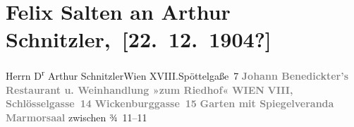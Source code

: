 

         
         \renewcommand{\erwaehntePersonen}{Personen: Johann Benedickter, Anna Katharina Rehmann, Felix Salten, Ottilie Salten}
         \renewcommand{\erwaehnteOrte}{Orte: Edmund-Weiß-Gasse 7, Riedhof, Schlösselgasse, Wickenburggasse, Wien, XVIII., Währing}
         \renewcommand{\erwaehnteWerke}{Werke: Symphonie Nr. 3 D-Moll}
               \section[ Felix Salten an Arthur Schnitzler, {[}22. 12. 1904?{]}]{ Felix Salten an Arthur Schnitzler, {[}22. 12. 1904?{]}}\nopagebreak{}\rehead{ }\begin{ledgroupsized}[t]{13cm}\normalsize\beginnumbering \toendnotes[C]{\smallbreak\pagebreak[2]} 
\toendnotes[C]{\smallbreak}\pstart{}{\pb}Herrn D\textsuperscript{r} Arthur Schnitzler\pend{}\pstart{}Wien XVIII.\pend{}\pstart{}Spöttelgaße 7\pend{}{\bigskip}\pstart
           \noindent{}\centering{}{\pb}\textcolor{gray}{\textbf{Johann Benedickter’s}}\pend
           \pstart
           \noindent{}\centering{}\textcolor{gray}{\textbf{Restaurant u. Weinhandlung »zum Riedhof«}}\pend
           \pstart
           \noindent{}\centering{}\textcolor{gray}{\textbf{WIEN}}\pend
           \pstart
           \noindent{}\centering{}\textcolor{gray}{\textbf{VIII, Schlösselgasse 14}}\pend
           \pstart
           \noindent{}\centering{}\textcolor{gray}{\textbf{Wickenburggasse 15}}\pend
           \pstart
           \noindent{}\centering{}\textcolor{gray}{\textbf{Garten mit Spiegelveranda}}\pend
           \pstart
           \noindent{}\centering{}\textcolor{gray}{\textbf{Marmorsaal}}\pend
           \pstart
           zwischen ¾ 11–11\pend
           \pstart

\end{ledgroupsized}
